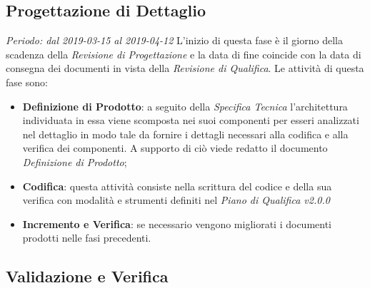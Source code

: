 \subsection{Progettazione di Dettaglio}
\textit{Periodo: dal 2019-03-15 al 2019-04-12}
L'inizio di questa fase è il giorno della scadenza della \textit{Revisione di 
Progettazione} e la data di fine coincide con la data di consegna dei documenti 
in vista della \textit{Revisione di Qualifica}. Le attività di questa fase sono:
\begin{itemize}
	\item \textbf{Definizione di Prodotto}: a seguito della \textit{Specifica 
	Tecnica} l'architettura individuata in essa viene scomposta nei suoi 
	componenti per esseri analizzati nel dettaglio in modo tale da fornire i 
	dettagli necessari alla codifica e alla verifica dei componenti. A supporto 
	di ciò viede redatto il documento \textit{Definizione di Prodotto};
	\item \textbf{Codifica}: questa attività consiste nella scrittura del 
	codice e della sua verifica con modalità e strumenti definiti nel 
	\textit{Piano di Qualifica v2.0.0}
	\item \textbf{Incremento e Verifica}: se necessario vengono migliorati i 
	documenti prodotti nelle fasi precedenti.
\end{itemize}

\subsection{Validazione e Verifica}